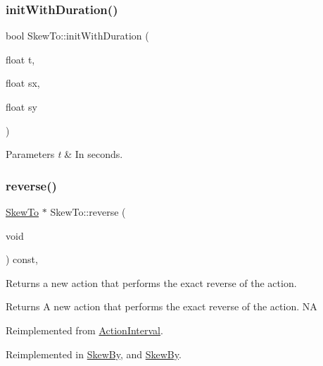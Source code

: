 \subsubsection{\texorpdfstring{init\+With\+Duration()}{initWithDuration()}\hspace{0.1cm}{\footnotesize\ttfamily [2/2]}}
{\footnotesize\ttfamily bool Skew\+To\+::init\+With\+Duration (\begin{DoxyParamCaption}\item[{float}]{t,  }\item[{float}]{sx,  }\item[{float}]{sy }\end{DoxyParamCaption})}


\begin{DoxyParams}{Parameters}
{\em t} & In seconds. \\
\hline
\end{DoxyParams}
\mbox{\label{classSkewTo_a4e35b4a1e7572f0c74c8d7684f02f3fd}} 
\subsubsection{\texorpdfstring{reverse()}{reverse()}\hspace{0.1cm}{\footnotesize\ttfamily [1/2]}}
{\footnotesize\ttfamily \hyperlink{classSkewTo}{Skew\+To} $\ast$ Skew\+To\+::reverse (\begin{DoxyParamCaption}\item[{void}]{ }\end{DoxyParamCaption}) const\hspace{0.3cm}{\ttfamily [override]}, {\ttfamily [virtual]}}

Returns a new action that performs the exact reverse of the action.

\begin{DoxyReturn}{Returns}
A new action that performs the exact reverse of the action.  NA 
\end{DoxyReturn}


Reimplemented from \hyperlink{classActionInterval_a9f9ac7164036a0bc261a72f62a2b2da7}{Action\+Interval}.



Reimplemented in \hyperlink{classSkewBy_aab134941d72a83d6249553e8e772da35}{Skew\+By}, and \hyperlink{classSkewBy_ab7828c1588809a605fac2cba100f148d}{Skew\+By}.

\mbox{\label{classSkewTo_acdbc6d19ee729b69ab097e449d09379f}} 

